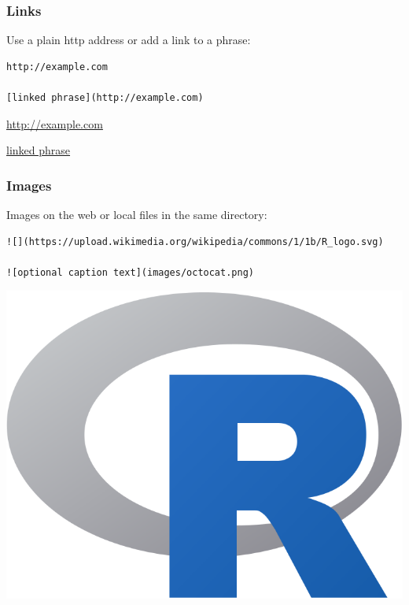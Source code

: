 \documentclass[]{book}
\begin{document}
\hypertarget{links}{%
\subsubsection{Links}\label{links}}

Use a plain http address or add a link to a phrase:

\begin{verbatim}
http://example.com

[linked phrase](http://example.com)
\end{verbatim}

\url{http://example.com}

\href{http://example.com}{linked phrase}

\hypertarget{images}{%
\subsubsection{Images}\label{images}}

Images on the web or local files in the same directory:

\begin{verbatim}
![](https://upload.wikimedia.org/wikipedia/commons/1/1b/R_logo.svg)

![optional caption text](images/octocat.png)
\end{verbatim}

\includegraphics{images/R_logo.png}
\end{document}
